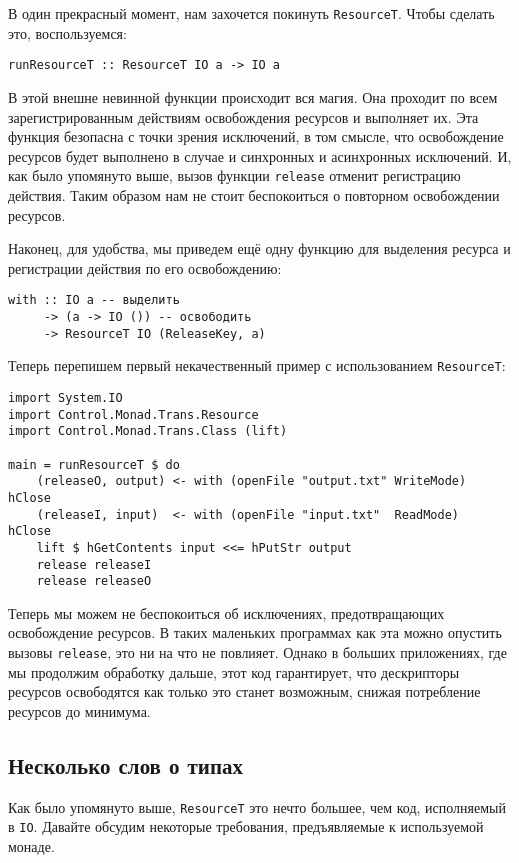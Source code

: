 В один прекрасный момент, нам захочется покинуть \lstinline'ResourceT'. Чтобы сделать это,
воспользуемся:
\begin{lstlisting}
runResourceT :: ResourceT IO a -> IO a
\end{lstlisting}
В этой внешне невинной функции происходит вся магия. Она проходит по всем зарегистрированным действиям освобождения ресурсов и выполняет их. 
Эта функция безопасна с точки зрения исключений, в
том смысле, что освобождение ресурсов будет выполнено в случае и синхронных и
асинхронных исключений. И, как было упомянуто выше, вызов функции \lstinline'release'
отменит
регистрацию действия. Таким образом нам не стоит беспокоиться о повторном освобождении
ресурсов.

Наконец, для удобства, мы приведем ещё одну функцию для выделения ресурса и регистрации
действия по его освобождению:
\begin{lstlisting}
with :: IO a -- выделить
     -> (a -> IO ()) -- освободить
     -> ResourceT IO (ReleaseKey, a)
\end{lstlisting}

Теперь перепишем первый некачественный пример с использованием \lstinline'ResourceT':
\begin{lstlisting}
import System.IO
import Control.Monad.Trans.Resource
import Control.Monad.Trans.Class (lift)

main = runResourceT $ do
    (releaseO, output) <- with (openFile "output.txt" WriteMode) hClose
    (releaseI, input)  <- with (openFile "input.txt"  ReadMode)  hClose
    lift $ hGetContents input <<= hPutStr output
    release releaseI
    release releaseO
\end{lstlisting}

Теперь мы можем не беспокоиться об исключениях, предотвращающих освобождение ресурсов.
В таких маленьких программах как эта можно опустить вызовы \verb=release=, это ни на что
не повлияет. Однако в больших приложениях, где мы продолжим обработку дальше, этот код
гарантирует, что дескрипторы ресурсов освободятся как только это станет возможным, снижая
потребление ресурсов до минимума.

\subsection{Несколько слов о типах}

Как было упомянуто выше, \lstinline'ResourceT' это нечто большее, чем код, исполняемый в \lstinline{IO}.
Давайте обсудим некоторые требования, предъявляемые к используемой монаде.

